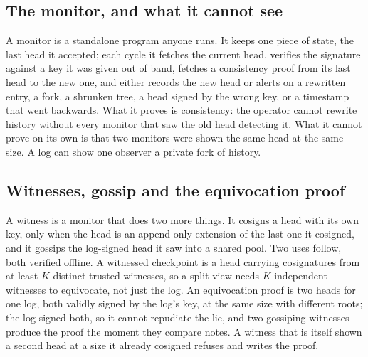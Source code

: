 \subsection{The monitor, and what it cannot see}

A monitor is a standalone program anyone runs. It keeps one piece of state, the last head it
accepted; each cycle it fetches the current head, verifies the signature against a key it was given
out of band, fetches a consistency proof from its last head to the new one, and either records the
new head or alerts on a rewritten entry, a fork, a shrunken tree, a head signed by the wrong key, or
a timestamp that went backwards. What it proves is consistency: the operator cannot rewrite history
without every monitor that saw the old head detecting it. What it cannot prove on its own is that
two monitors were shown the same head at the same size. A log can show one observer a private fork
of history. \sImpl

\subsection{Witnesses, gossip and the equivocation proof}


A witness is a monitor that does two more things. It cosigns a head with its own key, only when the
head is an append-only extension of the last one it cosigned, and it gossips the log-signed head it
saw into a shared pool. Two uses follow, both verified offline. A witnessed checkpoint is a head
carrying cosignatures from at least $K$ distinct trusted witnesses, so a split view needs $K$
independent witnesses to equivocate, not just the log. An equivocation proof is two heads for one
log, both validly signed by the log's key, at the same size with different roots; the log signed
both, so it cannot repudiate the lie, and two gossiping witnesses produce the proof the moment they
compare notes. A witness that is itself shown a second head at a size it already cosigned refuses
and writes the proof. \sImpl


